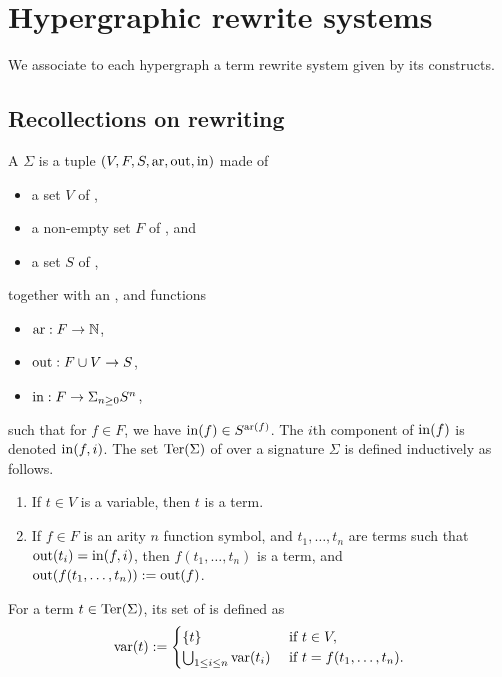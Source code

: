 
\section{Hypergraphic rewrite systems} 
\label{s:rewriting}

We associate to each hypergraph a term rewrite system given by its constructs.


\subsection{Recollections on rewriting}

A  $\Sigma$ is a tuple $(V,F,S,\mathrm{ar},\operatorname{out},\operatorname{in})$ made of 
\begin{itemize}
  \item a set $V$ of ,
  \item a non-empty set $F$ of , and
  \item a set $S$ of ,
\end{itemize}
together with an ,  and  functions
\begin{itemize}
  \item $\mathrm{ar} : F \to \mathbb{N}$,
  \item $\operatorname{out} : F \cup V \to S$,
  \item $\operatorname{in} : F \to \Sigma_{n \geq 0} S^{n}$,
\end{itemize}
such that for $f \in F$, we have $\operatorname{in}(f) \in S^{\mathrm{ar}(f)}$. 
The $i$th component of $\operatorname{in}(f)$ is denoted $\operatorname{in}(f,i)$.
The set $\operatorname{Ter}(\Sigma)$ of  over a signature $\Sigma$ is defined inductively as follows. 
\begin{enumerate}
  \item If $t \in V$ is a variable, then $t$ is a term.
  \item If $f \in F$ is an arity $n$ function symbol, and $t_1,\ldots,t_n$ are terms such that $\operatorname{out}(t_i)=\operatorname{in}(f,i)$, then $f(t_1,\ldots,t_n)$ is a term, and $\operatorname{out}(f(t_1,\ldots,t_n)):=\operatorname{out}(f)$.
\end{enumerate}
For a term $t \in \operatorname{Ter}(\Sigma)$, its set of  is defined as 
\begin{equation*}
  \operatorname{var}(t) := 
  \begin{cases}
    \{t\} & \text{ if } t \in V, \\
    \bigcup_{1 \leq i \leq n}\operatorname{var}(t_i) & \text{ if } t=f(t_1,\ldots,t_n).
  \end{cases}
\end{equation*}
